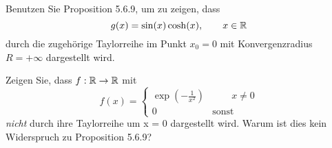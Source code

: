 \begin{Problem}
\begin{parts}
	\item Benutzen Sie Proposition 5.6.9, um zu zeigen, dass
		\[
		g(x)=\sin(x)\cosh(x), \qquad x\in \mathbb{R}
		\] 
durch die zugehörige Taylorreihe im Punkt $x_0 = 0$ mit Konvergenzradius $R=+\infty$ dargestellt wird.
\item Zeigen Sie, dass $f:\mathbb{R}\to \mathbb{R}$ mit
	\[
	f(x)=\begin{cases}
		\exp\left( -\frac{1}{x^2} \right) & \qquad x \neq 0\\
		0 & \text{sonst}
	\end{cases}
	\]
	\emph{nicht} durch ihre Taylorreihe um x = 0 dargestellt wird. Warum ist dies kein Widerspruch zu Proposition 5.6.9?
\end{parts}	
\end{Problem}

